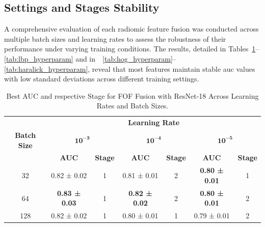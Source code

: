 \subsection{Settings and Stages Stability}

A comprehensive evaluation of each radiomic feature fusion was conducted across multiple batch sizes and learning rates to assess the robustness of their performance under varying training conditions. The results, detailed in Tables~\ref{tab:fof_hyperparam}--\ref{tab:lbp_hyperparam} and in~~\ref{tab:hog_hyperparam}--\ref{tab:haralick_hyperparam}, reveal that most features maintain stable \ac{auc} values with low standard deviations across different training settings.

\begin{table}[htbp]
  \centering
  \caption[Best AUC and Stage for FOF Fusion]{Best AUC and respective Stage for FOF Fusion with ResNet-18 Across Learning Rates and Batch Sizes.}
  \label{tab:fof_hyperparam}
  \begin{tabular}{@{} c *{3}{cc} @{}}
    \toprule
    & \multicolumn{6}{c}{\textbf{Learning Rate}} \\
    \cmidrule(lr){2-7}
    \textbf{Batch Size} 
      & \multicolumn{2}{c}{\(\mathbf{10^{-3}}\)} 
      & \multicolumn{2}{c}{\(\mathbf{10^{-4}}\)} 
      & \multicolumn{2}{c}{\(\mathbf{10^{-5}}\)} \\
    \cmidrule(lr){2-3} \cmidrule(lr){4-5} \cmidrule(lr){6-7}
    & \textbf{AUC} & \textbf{Stage} 
    & \textbf{AUC} & \textbf{Stage} 
    & \textbf{AUC} & \textbf{Stage} \\
    \midrule
    32  
      & 0.82 ± 0.02 & 1 
      & 0.81 ± 0.01 & 2 
      & \textbf{0.80 ± 0.01} & 1 \\
    64  
      & \textbf{0.83 ± 0.03} & 1 
      & \textbf{0.82 ± 0.02} & 2 
      & \textbf{0.80 ± 0.01} & 2 \\
    128 
      & 0.82 ± 0.02 & 1 
      & 0.80 ± 0.01 & 1 
      & 0.79 ± 0.01 & 2 \\
    \bottomrule
  \end{tabular}
\end{table}

